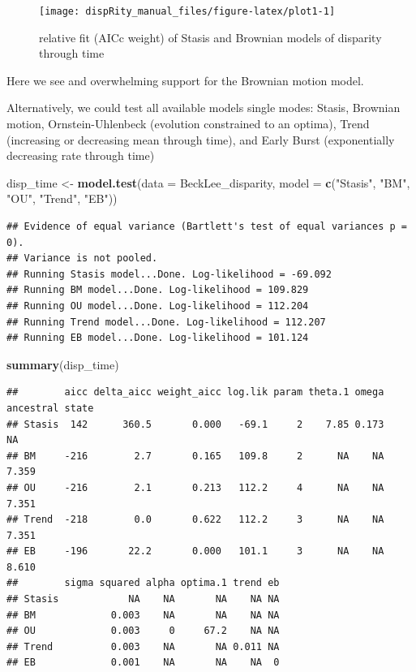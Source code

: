 \documentclass[]{book}
\newenvironment{Shaded}{\begin{snugshade}}{\end{snugshade}}
\newcommand{\DataTypeTok}[1]{\textcolor[rgb]{0.13,0.29,0.53}{#1}}
\newcommand{\KeywordTok}[1]{\textcolor[rgb]{0.13,0.29,0.53}{\textbf{#1}}}
\newcommand{\NormalTok}[1]{#1}
\newcommand{\StringTok}[1]{\textcolor[rgb]{0.31,0.60,0.02}{#1}}
\begin{document}
\begin{figure}

{\centering \texttt{[image: dispRity\_manual\_files/figure-latex/plot1-1]} 

}

\caption{relative fit (AICc weight) of Stasis and Brownian models of disparity through time}\label{fig:plot1}
\end{figure}

Here we see and overwhelming support for the Brownian motion model.

Alternatively, we could test all available models single modes: Stasis, Brownian motion, Ornstein-Uhlenbeck (evolution constrained to an optima), Trend (increasing or decreasing mean through time), and Early Burst (exponentially decreasing rate through time)

\begin{Shaded}
\begin{Highlighting}[]
\NormalTok{disp_time <-}\StringTok{ }\KeywordTok{model.test}\NormalTok{(}\DataTypeTok{data =}\NormalTok{ BeckLee_disparity,}
                  \DataTypeTok{model =} \KeywordTok{c}\NormalTok{(}\StringTok{"Stasis"}\NormalTok{, }\StringTok{"BM"}\NormalTok{, }\StringTok{"OU"}\NormalTok{, }\StringTok{"Trend"}\NormalTok{, }\StringTok{"EB"}\NormalTok{))}
\end{Highlighting}
\end{Shaded}

\begin{verbatim}
## Evidence of equal variance (Bartlett's test of equal variances p = 0).
## Variance is not pooled.
## Running Stasis model...Done. Log-likelihood = -69.092
## Running BM model...Done. Log-likelihood = 109.829
## Running OU model...Done. Log-likelihood = 112.204
## Running Trend model...Done. Log-likelihood = 112.207
## Running EB model...Done. Log-likelihood = 101.124
\end{verbatim}

\begin{Shaded}
\begin{Highlighting}[]
\KeywordTok{summary}\NormalTok{(disp_time)}
\end{Highlighting}
\end{Shaded}

\begin{verbatim}
##        aicc delta_aicc weight_aicc log.lik param theta.1 omega ancestral state
## Stasis  142      360.5       0.000   -69.1     2    7.85 0.173              NA
## BM     -216        2.7       0.165   109.8     2      NA    NA           7.359
## OU     -216        2.1       0.213   112.2     4      NA    NA           7.351
## Trend  -218        0.0       0.622   112.2     3      NA    NA           7.351
## EB     -196       22.2       0.000   101.1     3      NA    NA           8.610
##        sigma squared alpha optima.1 trend eb
## Stasis            NA    NA       NA    NA NA
## BM             0.003    NA       NA    NA NA
## OU             0.003     0     67.2    NA NA
## Trend          0.003    NA       NA 0.011 NA
## EB             0.001    NA       NA    NA  0
\end{verbatim}
\end{document}
